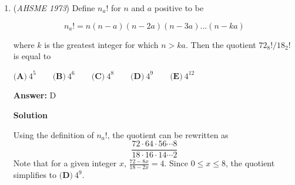 \begin{enumerate}
 \textbf{Answer: }C



\textbf{Solution}

Starting with some experimentation, substituting $p=5$ results in $24$, substituting $p=7$ results in $48$, and substituting $p=11$ results in $120$.  For these primes, the resulting numbers are multiples of $24$.

 To show that all primes we devise the following proof:

 $Proof:$$p \ge 5$ result in $p^2 -1$ being a multiple of $24$, we can use modular arithmetic.  Note that $p^2 - 1 = (p+1)(p-1)$.  Since $p^2 \equiv 0,1,2,3 \mod 4$, $p^2 - 1$ is a multiple of $8$.  Also, since $p^2 \equiv 0,1,2 \mod 3$, $p^2 - 1$ is a multiple of $3$.  Thus, $p^2 -1$ is a multiple of $24$, so the answer is $\boxed{\textbf{(C)}}$.

 



\textbf{Solution 1}

We can try a few values of $p \ge 5$ and notice that $p^2-1$ is $\boxed{(\textbf{C})}$ always divisible by $24$. The proof is as follows:

 $p^2-1=(p+1)(p-1)$ and since all primes $p \ge 5$ are odd, both of these factors are consecutive even numbers, which is divisible by $8$. Also, notice that for $p \ge 5$, $p \equiv \pm 1 \pmod{3} \implies p^2-1 \equiv 0 \pmod{3}$. Therefore, $\forall p \ge 5, \, 24 \mid p^2-1$.

 


	\item (\textit{AHSME 1973}) Define $n_a!$ for $n$ and $a$ positive to be 


 
 \[n_a ! = n (n-a)(n-2a)(n-3a)...(n-ka)\]


 where $k$ is the greatest integer for which $n>ka$. Then the quotient $72_8!/18_2!$ is equal to 


 $\textbf{(A)}\ 4^5 \qquad \textbf{(B)}\ 4^6 \qquad \textbf{(C)}\ 4^8 \qquad \textbf{(D)}\ 4^9 \qquad \textbf{(E)}\ 4^{12}$

 \textbf{Answer: }D



\textbf{Solution}

Using the definition of $n_a!$, the quotient can be rewritten as
 \[\frac{72 \cdot 64 \cdot 56 \cdots 8}{18 \cdot 16 \cdot 14 \cdots 2}\]Note that for a given integer $x$, $\frac{72-8x}{18-2x} = 4$.  Since $0 \le x \le 8$, the quotient simplifies to $\boxed{\textbf{(D)}\ 4^9}$.


\end{enumerate}
